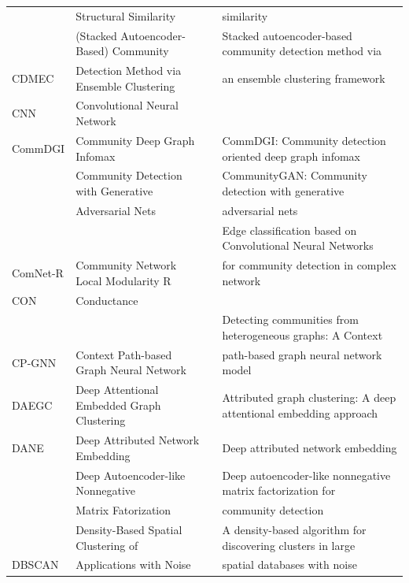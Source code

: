 \begin{table}[h]
\begin{tabular}{llll}
\rowcolor{gray!30}
\multirow{-2}{*}{CDASS} & Structural Similarity & \multirow{-2}{*}{} & similarity \\
& (Stacked Autoencoder-Based) Community &  & Stacked autoencoder-based community detection method via  \\
\multirow{-2}{*}{CDMEC} & Detection Method via Ensemble Clustering & \multirow{-2}{*}{} & an ensemble clustering framework \\
\rowcolor{gray!30}
CNN & Convolutional Neural Network &  &  \\
CommDGI & Community Deep Graph Infomax &  & CommDGI: Community detection oriented deep graph infomax \\
\rowcolor{gray!30}
& Community Detection with Generative & & CommunityGAN: Community detection with generative \\
\rowcolor{gray!30}
\multirow{-2}{*}{CommunityGAN} & Adversarial Nets & \multirow{-2}{*}{} & adversarial nets \\
&  &  & Edge classification based on Convolutional Neural Networks  \\
\multirow{-2}{*}{ComNet-R} & \multirow{-2}{*}{Community Network Local Modularity R} & \multirow{-2}{*}{} & for community detection in complex network \\
\rowcolor{gray!30}
CON & Conductance &  &  \\ 
& & & Detecting communities from heterogeneous graphs: A Context  \\
\multirow{-2}{*}{CP-GNN} & \multirow{-2}{*}{Context Path-based Graph Neural Network} & \multirow{-2}{*}{} & path-based graph neural network model \\
\midrule
\rowcolor{gray!30}
DAEGC & Deep Attentional Embedded Graph Clustering &  & Attributed graph clustering: A deep attentional embedding approach \\ 
DANE & Deep Attributed Network Embedding &  & Deep attributed network embedding \\
\rowcolor{gray!30}
& Deep Autoencoder-like Nonnegative & & Deep autoencoder-like nonnegative matrix factorization for \\
\rowcolor{gray!30}
\multirow{-2}{*}{DANMF} & Matrix Fatorization & \multirow{-2}{*}{} & community detection \\
& Density-Based Spatial Clustering of &  & A density-based algorithm for discovering clusters in large \\
\multirow{-2}{*}{DBSCAN} & Applications with Noise & \multirow{-2}{*}{} & spatial databases with noise \\

\end{tabular}
\end{table}
